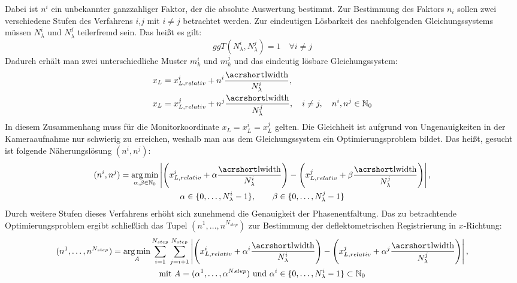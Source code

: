 %
Dabei ist $n^i$ ein unbekannter ganzzahliger Faktor, der die absolute Auswertung bestimmt.
Zur Bestimmung des Faktors $n_i$ sollen zwei verschiedene Stufen des Verfahrens $i$,$j$ mit $i \neq j$ betrachtet werden.
Zur eindeutigen Lösbarkeit des nachfolgenden Gleichungssystems müssen $N_\lambda^i$ und $N_\lambda^j$ teilerfremd sein.
Das heißt es gilt:
%
\begin{equation*}
	ggT(N_\lambda^i, N_\lambda^j) = 1
	\quad
	\forall i \neq j
\end{equation*}
%
Dadurch erhält man zwei unterschiedliche Muster $m_k^i$ und $m_k^j$ und das eindeutig lösbare Gleichungssystem:
%
\begin{equation}\label{eq:gleichungssystemRegistrierung}
	\begin{split}
		x_L & = x_{L,relativ}^i + n^i \dfrac{\acrshortmath{lwidth}}{N_\lambda^i},\\
		x_L & = x_{L,relativ}^j + n^j \dfrac{\acrshortmath{lwidth}}{N_\lambda^j},
		\quad i \neq j,
		\quad n^i, n^j \in \mathbb{N}_0
	\end{split}
\end{equation}
%
In diesem Zusammenhang muss für die Monitorkoordinate $x_L = x_L^i = x_L^j$ gelten.
Die Gleichheit ist aufgrund von Ungenauigkeiten in der Kameraaufnahme nur schwierig zu erreichen, weshalb man aus dem Gleichungssystem ein Optimierungsproblem bildet.
Das heißt, gesucht ist folgende Näherungslösung $(n^i, n^j)$:
%
\begin{equation}\label{eq:optimierungsProblem_zweiStufen}
	\begin{gathered}	
		(n^i, n^j) = \argmin_{\alpha, \beta \in \mathbb{N}_0}
		\left\lvert
			\Bigg(
				x_{L,relativ}^i + \alpha \dfrac{\acrshortmath{lwidth}}{N_\lambda^i}
			\Bigg)
			-
			\Bigg(		
				x_{L,relativ}^j + \beta \dfrac{\acrshortmath{lwidth}}{N_\lambda^j}
			\Bigg)
		\right\rvert,\\
		\alpha \in \lbrace 0,\ldots, N_\lambda^i - 1\rbrace,
		\qquad
		\beta \in \lbrace 0,\ldots, N_\lambda^j - 1\rbrace
	\end{gathered}
\end{equation}
%
Durch weitere Stufen dieses Verfahrens erhöht sich zunehmend die Genauigkeit der Phasenentfaltung.
Das zu betrachtende Optimierungsproblem ergibt schließlich das Tupel $(n^1,\ldots, n^{N_{step}})$ zur Bestimmung der deflektometrischen Registrierung in $x$-Richtung:
%
\begin{equation}\label{eq:optimierungsProblem_mehrstufig}
	\begin{gathered}	
		(n^1,\ldots, n^{N_{step}}) = \argmin_{\mathrm{\textit{A}}}
		\sum\limits_{i = 1}^{N_{step}}
		\sum\limits_{j = i + 1}^{N_{step}}
		\left\lvert
			\Bigg(
				x_{L,relativ}^i + \alpha^i \dfrac{\acrshortmath{lwidth}}{N_\lambda^i}
			\Bigg)
			-
			\Bigg(		
				x_{L,relativ}^j + \alpha^j \dfrac{\acrshortmath{lwidth}}{N_\lambda^j}
			\Bigg)
		\right\rvert,\\
		\text{mit} ~\mathrm{\textit{A}} = (\alpha^1,\ldots,\alpha^{N{step}}) ~\text{und} ~\alpha^i \in \lbrace 0,\ldots, N_\lambda^i - 1 \rbrace \subset \mathbb{N}_0
	\end{gathered}
\end{equation}

